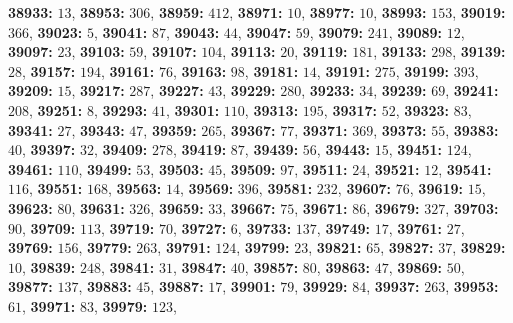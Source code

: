 \textsf{\bfseries 38933:} $13$, \textsf{\bfseries 38953:} $306$, \textsf{\bfseries 38959:} $412$, \textsf{\bfseries 38971:} $10$, \textsf{\bfseries 38977:} $10$, \textsf{\bfseries 38993:} $153$, \textsf{\bfseries 39019:} $366$, \textsf{\bfseries 39023:} $5$, \textsf{\bfseries 39041:} $87$, \textsf{\bfseries 39043:} $44$, \textsf{\bfseries 39047:} $59$, \textsf{\bfseries 39079:} $241$, \textsf{\bfseries 39089:} $12$, \textsf{\bfseries 39097:} $23$, \textsf{\bfseries 39103:} $59$, \textsf{\bfseries 39107:} $104$, \textsf{\bfseries 39113:} $20$, \textsf{\bfseries 39119:} $181$, \textsf{\bfseries 39133:} $298$, \textsf{\bfseries 39139:} $28$, \textsf{\bfseries 39157:} $194$, \textsf{\bfseries 39161:} $76$, \textsf{\bfseries 39163:} $98$, \textsf{\bfseries 39181:} $14$, \textsf{\bfseries 39191:} $275$, \textsf{\bfseries 39199:} $393$, \textsf{\bfseries 39209:} $15$, \textsf{\bfseries 39217:} $287$, \textsf{\bfseries 39227:} $43$, \textsf{\bfseries 39229:} $280$, \textsf{\bfseries 39233:} $34$, \textsf{\bfseries 39239:} $69$, \textsf{\bfseries 39241:} $208$, \textsf{\bfseries 39251:} $8$, \textsf{\bfseries 39293:} $41$, \textsf{\bfseries 39301:} $110$, \textsf{\bfseries 39313:} $195$, \textsf{\bfseries 39317:} $52$, \textsf{\bfseries 39323:} $83$, \textsf{\bfseries 39341:} $27$, \textsf{\bfseries 39343:} $47$, \textsf{\bfseries 39359:} $265$, \textsf{\bfseries 39367:} $77$, \textsf{\bfseries 39371:} $369$, \textsf{\bfseries 39373:} $55$, \textsf{\bfseries 39383:} $40$, \textsf{\bfseries 39397:} $32$, \textsf{\bfseries 39409:} $278$, \textsf{\bfseries 39419:} $87$, \textsf{\bfseries 39439:} $56$, \textsf{\bfseries 39443:} $15$, \textsf{\bfseries 39451:} $124$, \textsf{\bfseries 39461:} $110$, \textsf{\bfseries 39499:} $53$, \textsf{\bfseries 39503:} $45$, \textsf{\bfseries 39509:} $97$, \textsf{\bfseries 39511:} $24$, \textsf{\bfseries 39521:} $12$, \textsf{\bfseries 39541:} $116$, \textsf{\bfseries 39551:} $168$, \textsf{\bfseries 39563:} $14$, \textsf{\bfseries 39569:} $396$, \textsf{\bfseries 39581:} $232$, \textsf{\bfseries 39607:} $76$, \textsf{\bfseries 39619:} $15$, \textsf{\bfseries 39623:} $80$, \textsf{\bfseries 39631:} $326$, \textsf{\bfseries 39659:} $33$, \textsf{\bfseries 39667:} $75$, \textsf{\bfseries 39671:} $86$, \textsf{\bfseries 39679:} $327$, \textsf{\bfseries 39703:} $90$, \textsf{\bfseries 39709:} $113$, \textsf{\bfseries 39719:} $70$, \textsf{\bfseries 39727:} $6$, \textsf{\bfseries 39733:} $137$, \textsf{\bfseries 39749:} $17$, \textsf{\bfseries 39761:} $27$, \textsf{\bfseries 39769:} $156$, \textsf{\bfseries 39779:} $263$, \textsf{\bfseries 39791:} $124$, \textsf{\bfseries 39799:} $23$, \textsf{\bfseries 39821:} $65$, \textsf{\bfseries 39827:} $37$, \textsf{\bfseries 39829:} $10$, \textsf{\bfseries 39839:} $248$, \textsf{\bfseries 39841:} $31$, \textsf{\bfseries 39847:} $40$, \textsf{\bfseries 39857:} $80$, \textsf{\bfseries 39863:} $47$, \textsf{\bfseries 39869:} $50$, \textsf{\bfseries 39877:} $137$, \textsf{\bfseries 39883:} $45$, \textsf{\bfseries 39887:} $17$, \textsf{\bfseries 39901:} $79$, \textsf{\bfseries 39929:} $84$, \textsf{\bfseries 39937:} $263$, \textsf{\bfseries 39953:} $61$, \textsf{\bfseries 39971:} $83$, \textsf{\bfseries 39979:} $123$, 
